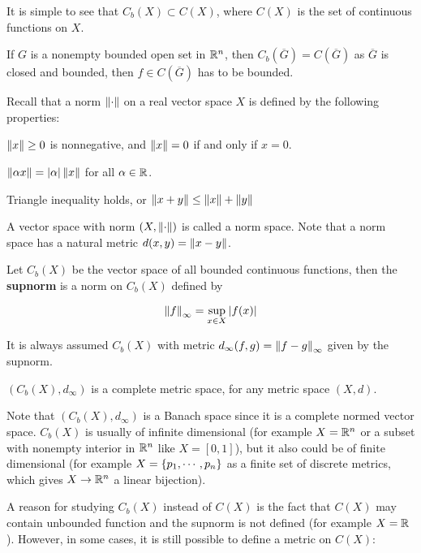 \documentclass[a4paper,12pt]{article}
\begin{document}
It is simple to see that $C_{b}(X)\subset C(X)$, where $C(X)$ is the set of continuous functions on $X$.\n

\begin{exm}
  If $G$ is a nonempty bounded open set in $\mathbb{R}^{n}$, then $C_{b}(\overline{G})=C(\overline{G})$ as $\overline{G}$ is closed and bounded, then $f\in C(\overline{G})$ has to be bounded.
\end{exm}\n

Recall that a norm $\left\| \cdot\right\|$ on a real vector space $X$ is defined by the following properties:

\begin{alist}
  \item $\left\| x\right\|\geq 0$ is nonnegative, and $\left\| x\right\|=0$ if and only if $x=0$.
  \item $\left\| \alpha x\right\|=\left| \alpha\right|\left\| x\right\|$ for all $\alpha\in\mathbb{R}$.
  \item Triangle inequality holds, or $\left\| x+y\right\|\leq\left\| x\right\|+\left\| y\right\|$
\end{alist}

A vector space with norm $(X,\left\| \cdot\right\|)$ is called a norm space. Note that a norm space has a natural metric $d(x,y)=\left\| x-y\right\|$.\n

\begin{dft}
  Let $C_{b}(X)$ be the vector space of all bounded continuous functions, then the \textbf{supnorm} is a norm on $C_{b}(X)$ defined by

  $$\left\| f\right\|_{\infty}=\underset{x\in X}{\sup}\left| f(x)\right|$$
\end{dft}\n

It is always assumed $C_{b}(X)$ with metric $d_{\infty}(f,g)=\left\| f-g\right\|_{\infty}$ given by the supnorm.\n

\begin{pst}
  $(C_{b}(X),d_{\infty})$ is a complete metric space, for any metric space $(X,d)$.
\end{pst}\n

Note that $(C_{b}(X),d_{\infty})$ is a Banach space since it is a complete normed vector space. $C_{b}(X)$ is usually of infinite dimensional (for example $X=\mathbb{R}^{n}$ or a subset with nonempty interior in $\mathbb{R}^{n}$ like $X=[0,1]$), but it also could be of finite dimensional (for example $X=\left\{ p_{1},\cdots,p_{n}\right\}$ as a finite set of discrete metrics, which gives $X\to\mathbb{R}^{n}$ a linear bijection).\n

A reason for studying $C_{b}(X)$ instead of $C(X)$ is the fact that $C(X)$ may contain unbounded function and the supnorm is not defined (for example $X=\mathbb{R}$). However, in some cases, it is still possible to define a metric on $C(X)$:\n
\end{document}
